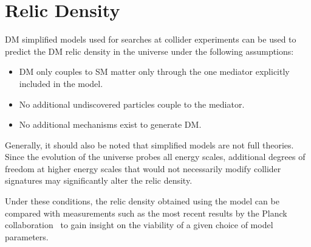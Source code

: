 

\newcommand{\dmsimp}{\textsc{DMsimp}\xspace}
\newcommand{\maddm}{\textsc{MadDM}\xspace}


\section{Relic Density}


DM simplified models used for searches at collider experiments can be used to predict the DM relic density in the universe under the following assumptions: 

\begin{itemize}
\item DM only couples to SM matter only through the one mediator explicitly included in the model.
\item No additional undiscovered particles couple to the mediator.
\item No additional mechanisms exist to generate DM.
\end{itemize}

Generally, it should also be noted that simplified models are not full theories. Since the evolution of the universe probes all energy scales, additional degrees of freedom at higher energy scales that would not necessarily modify collider signatures may significantly alter the relic density.

Under these conditions, the relic density obtained using the model can be compared with measurements such as the most recent results by the Planck collaboration~\cite{Planck} to gain insight on the viability of a given choice of model parameters.

